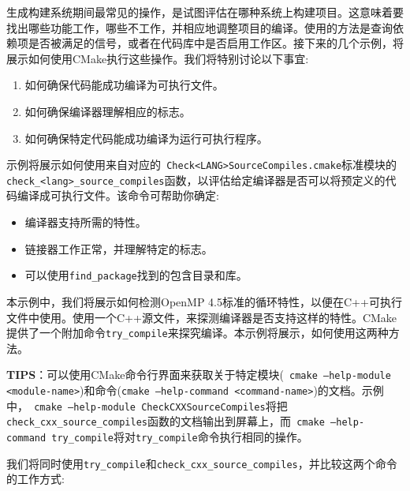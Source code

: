 生成构建系统期间最常见的操作，是试图评估在哪种系统上构建项目。这意味着要找出哪些功能工作，哪些不工作，并相应地调整项目的编译。使用的方法是查询依赖项是否被满足的信号，或者在代码库中是否启用工作区。接下来的几个示例，将展示如何使用CMake执行这些操作。我们将特别讨论以下事宜:

\begin{enumerate}
\item 如何确保代码能成功编译为可执行文件。

\item 如何确保编译器理解相应的标志。

\item 如何确保特定代码能成功编译为运行可执行程序。

\end{enumerate}


示例将展示如何使用来自对应的\texttt{ Check<LANG>SourceCompiles.cmake}标准模块的\texttt{check\_<lang>\_source\_compiles}函数，以评估给定编译器是否可以将预定义的代码编译成可执行文件。该命令可帮助你确定:

\begin{itemize}
\item 编译器支持所需的特性。

\item 链接器工作正常，并理解特定的标志。

\item 可以使用\texttt{find\_package}找到的包含目录和库。

\end{itemize}

本示例中，我们将展示如何检测OpenMP 4.5标准的循环特性，以便在C++可执行文件中使用。使用一个C++源文件，来探测编译器是否支持这样的特性。CMake提供了一个附加命令\texttt{try\_compile}来探究编译。本示例将展示，如何使用这两种方法。

\begin{myInfoBox}
\textbf{TIPS}：可以使用CMake命令行界面来获取关于特定模块(\texttt{ cmake --help-module <module-name>})和命令(\texttt{cmake --help-command <command-name>})的文档。示例中，\texttt{ cmake --help-module CheckCXXSourceCompiles}将把\texttt{check\_cxx\_source\_compiles}函数的文档输出到屏幕上，而\texttt{ cmake --help-command try\_compile}将对\texttt{try\_compile}命令执行相同的操作。
\end{myInfoBox}


我们将同时使用\texttt{try\_compile}和\texttt{check\_cxx\_source\_compiles}，并比较这两个命令的工作方式:

